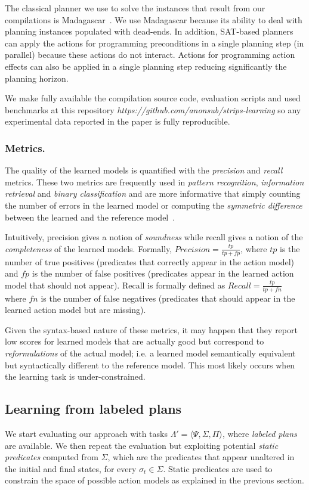 \documentclass[letterpaper]{article} %
\newcommand{\tup}[1]{{\langle #1 \rangle}}
\begin{document}
The classical planner we use to solve the instances that result from our compilations is {\sc Madagascar}~\cite{rintanen2014madagascar}. We use {\sc Madagascar} because its ability to deal with planning instances populated with dead-ends. In addition, SAT-based planners can apply the actions for programming preconditions in a single planning step (in parallel) because these actions do not interact. Actions for programming action effects can also be applied in a single planning step reducing significantly the planning horizon.

We make fully available the compilation source code, evaluation scripts and used benchmarks at this repository {\em https://github.com/anonsub/strips-learning} so any experimental data reported in the paper is fully reproducible.

\subsubsection{Metrics.}
The quality of the learned models is quantified with the {\em precision} and {\em recall} metrics. These two metrics are frequently used in {\em pattern recognition}, {\em information retrieval} and {\em binary classification} and are more informative that simply counting the number of errors in the learned model or computing the {\em symmetric difference} between the learned and the reference model~\cite{davis2006relationship}.

Intuitively, precision gives a notion of {\em soundness} while recall gives a notion of the {\em completeness} of the learned models. Formally, $Precision=\frac{tp}{tp+fp}$, where $tp$ is the number of true positives (predicates that correctly appear in the action model) and $fp$ is the number of false positives (predicates appear in the learned action model that should not appear). Recall is formally defined as $Recall=\frac{tp}{tp+fn}$ where $fn$ is the number of false negatives (predicates that should appear in the learned action model but are missing).

Given the syntax-based nature of these metrics, it may happen that they report low scores for learned models that are actually good but correspond to {\em reformulations} of the actual model; i.e. a learned model semantically equivalent but syntactically different to the reference model. This most likely occurs when the learning task is under-constrained.


\subsection{Learning from labeled plans}
We start evaluating our approach with tasks $\Lambda'=\tup{\Psi,\Sigma,\Pi}$, where {\em labeled plans} are available. We then repeat the evaluation but exploiting potential \emph{static predicates} computed from $\Sigma$, which are the predicates that appear  unaltered in the initial and final states, for every $\sigma_t\in\Sigma$. Static predicates are used to constrain the space of possible action models as explained in the previous section.
\end{document}
